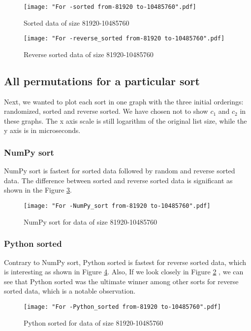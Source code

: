 \documentclass[sigconf, nonacm, natbib, screen, balance=False]{acmart}
\begin{document}
\begin{figure}[ht]
\texttt{[image: "For -sorted from-81920 to-10485760".pdf]}
    \caption{Sorted data of size 81920-10485760 }
    \label{fig:sorted1}
\end{figure}

\begin{figure}[ht]
\texttt{[image: "For -reverse\_sorted from-81920 to-10485760".pdf]}
    \caption{Reverse sorted data of size 81920-10485760 }
    \label{fig:rsorted1}
\end{figure}

\subsection{All permutations for a particular sort }\label{allpermut}

Next, we wanted to plot each sort in one graph with the three initial orderings: randomized, sorted and reverse sorted. We have chosen not to show $c_1$ and $c_2$ in these graphs. The x axis scale is still logarithm of the original list size, while the y axis is in microseconds.

\subsubsection{NumPy sort}
NumPy sort is fastest for sorted data followed by random and reverse sorted data. The difference between sorted and reverse sorted data is significant as shown in the Figure \ref{fig:NumPysort}.

\begin{figure}[ht]
\texttt{[image: "For -NumPy\_sort from-81920 to-10485760".pdf]}
    \caption{NumPy sort for data of size 81920-10485760 }
    \label{fig:NumPysort}
\end{figure}

\subsubsection{Python sorted}
Contrary to NumPy sort, Python sorted is fastest for reverse sorted data, which is interesting as shown in Figure \ref{fig:Pythonsorted}. Also, If we look closely in Figure \ref{fig:rsorted1} , we can see that Python sorted was the ultimate winner among other sorts for reverse sorted data, which is a notable observation.

\begin{figure}[ht]
\texttt{[image: "For -Python\_sorted from-81920 to-10485760".pdf]}
    \caption{Python sorted for data of size 81920-10485760 }
    \label{fig:Pythonsorted}
\end{figure}
\end{document}
